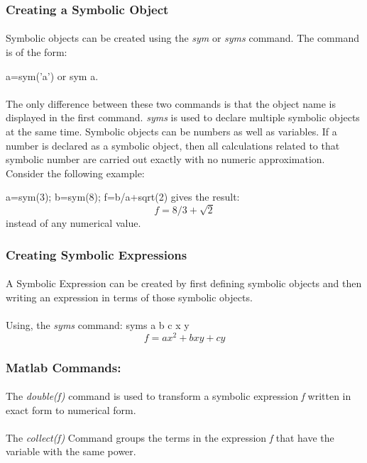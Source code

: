 \documentclass[]{article}
\begin{document}
\subsubsection{Creating a Symbolic Object}
\paragraph{}
Symbolic objects can be created using the \emph{sym} or \emph{syms} command. The command is of the form:

a=sym('a')
or 
sym a. 
\paragraph{}
The only difference between these two commands is that the object name is displayed in the first command. \emph{syms} is used to declare multiple symbolic objects at the same time.
Symbolic objects can be numbers as well as variables. If a number is declared as a symbolic object, then all calculations related to that symbolic number are carried out exactly with no numeric approximation. Consider the following example:

a=sym(3);
b=sym(8);
f=b/a+sqrt(2) gives the result:
\[
f=8/3+\sqrt2
\]
instead of any numerical value.
\subsubsection{Creating Symbolic Expressions}
\paragraph{}
A Symbolic Expression can be created by first defining symbolic objects and then writing an expression in terms of those symbolic objects. 
\paragraph{}
Using, the \emph{syms} command:
syms a b c x y
\[
f = ax^2+bxy+cy
\]
\subsubsection{Matlab Commands: }
\paragraph{}
The \emph{double(f)} command is used to transform a symbolic expression \emph{f} written in exact form to numerical form.
\paragraph{}
The \emph{collect(f)} Command groups the terms in the expression \emph {f} that have the variable with the same power.
\end{document}
